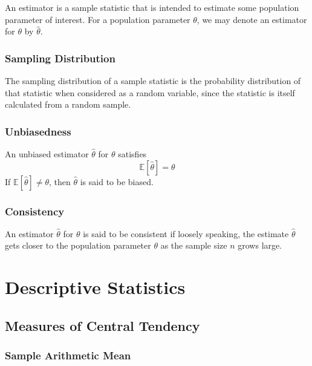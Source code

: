 \documentclass[11pt]{report} %
\begin{document}
An estimator is a sample statistic that is intended to estimate some population parameter of interest. For a population parameter $\theta$, we may denote an estimator for $\theta$ by $\hat{\theta}$.

\subsubsection{Sampling Distribution}

The sampling distribution of a sample statistic is the probability distribution of that statistic when considered as a random variable, since the statistic is itself calculated from a random sample.

\subsubsection{Unbiasedness}

An unbiased estimator $\hat{\theta}$ for $\theta$ satisfies
\begin{equation}
\mathbb{E}\left[\hat{\theta}\right] = \theta
\end{equation}
If $\mathbb{E}\left[\hat{\theta}\right] \neq \theta$, then $\hat{\theta}$ is said to be biased.

\subsubsection{Consistency}

An estimator $\hat{\theta}$ for $\theta$ is said to be consistent if loosely speaking, the estimate $\hat{\theta}$ gets closer to the population parameter $\theta$ as the sample size $n$ grows large.

\section{Descriptive Statistics}

\subsection{Measures of Central Tendency}

\subsubsection{Sample Arithmetic Mean}
\end{document}
